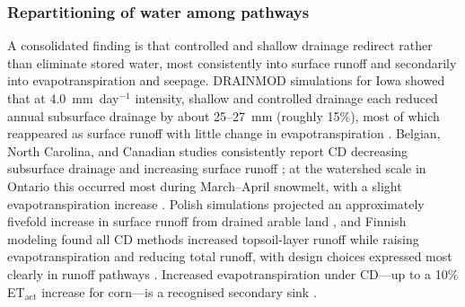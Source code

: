 \subsubsection{Repartitioning of water among pathways}

A consolidated finding is that controlled and shallow drainage redirect rather
than eliminate stored water, most consistently into surface runoff and
secondarily into evapotranspiration and seepage. DRAINMOD simulations for Iowa
showed that at 4.0~mm~day$^{-1}$ intensity, shallow and controlled drainage each
reduced annual subsurface drainage by about 25--27~mm (roughly 15\%), most of
which reappeared as surface runoff with little change in evapotranspiration
\parencite{Singh2007b}. Belgian, North Carolina, and Canadian studies
consistently report CD decreasing subsurface drainage and increasing surface
runoff \parencite{ElSadek2002,ElSadek2002b,DEAL1986,Skaggs1995,Golmohammadi2016,Ndulue2024};
at the watershed scale in Ontario this occurred most during March--April
snowmelt, with a slight evapotranspiration increase
\parencite{Golmohammadi2016}. Polish simulations projected an approximately
fivefold increase in surface runoff from drained arable land
\parencite{Sojka2020}, and Finnish modeling found all CD methods increased
topsoil-layer runoff while raising evapotranspiration and reducing total runoff,
with design choices expressed most clearly in runoff pathways
\parencite{Isomäki2024}. Increased evapotranspiration under CD---up to a 10\%
ET$_\mathrm{act}$ increase for corn---is a recognised secondary sink
\parencite{deWit2022,DEAL1986,Ndulue2024}.

